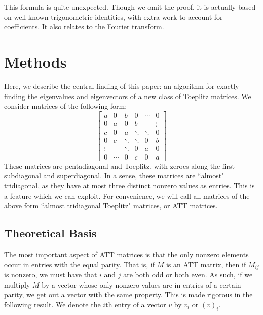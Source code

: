\documentclass[10pt,twocolumn]{article}
\begin{document}
This formula is quite unexpected. Though we omit the proof, it is actually based on well-known trigonometric identities, with extra work to account for coefficients. It also relates to the Fourier transform. \cite{Golub_2005}

\section{Methods}

Here, we describe the central finding of this paper: an algorithm for exactly finding the eigenvalues and eigenvectors of a new class of Toeplitz matrices. We consider matrices of the following form:
$$ \begin{bmatrix}
a & 0 & b & 0 & \cdots & 0 \\
0 & a & 0 & b &  & \vdots \\
c & 0 & a & \ddots & \ddots & 0 \\
0 & c & \ddots & \ddots & 0 & b \\
\vdots &  & \ddots & 0 & a & 0 \\
0 & \cdots & 0 & c & 0 & a 
\end{bmatrix}  $$
These matrices are pentadiagonal and Toeplitz, with zeroes along the first subdiagonal and superdiagonal. In a sense, these matrices are ``almost" tridiagonal, as they have at most three distinct nonzero values as entries. This is a feature which we can exploit. For convenience, we will call all matrices of the above form ``almost tridiagonal Toeplitz" matrices, or ATT matrices.

\subsection{Theoretical Basis}

The most important aspect of ATT matrices is that the only nonzero elements occur in entries with the equal parity. That is, if $M$ is an ATT matrix, then if $M_{ij}$ is nonzero, we must have that $i$ and $j$ are both odd or both even. As such, if we multiply $M$ by a vector whose only nonzero values are in entries of a certain parity, we get out a vector with the same property. This is made rigorous in the following result. We denote the $i$th entry of a vector $v$ by $v_i$ or $(v)_i$.
\end{document}

